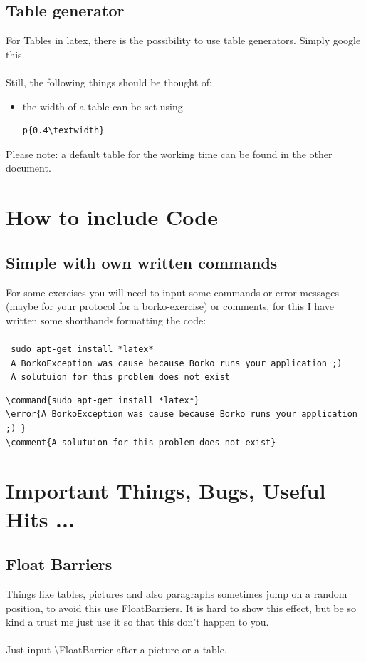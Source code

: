 \documentclass[12pt]{article}
\newcommand{\command}[1]{{\texttt{\color{blue} #1\\}}}
\newcommand{\error}[1]{{\texttt{\color{red} #1\\}}}
\newcommand{\comment}[1]{{\texttt{\color{OliveGreen} #1\\}}}
\begin{document}
\subsection{Table generator}
For Tables in latex, there is the possibility to use table generators. Simply google this.
\\ \\
Still, the following things should be thought of:
\\
\begin{itemize}
\item the width of a table can be set using 
\begin{lstlisting}
p{0.4\textwidth}
\end{lstlisting}
\end{itemize}

Please note: a default table for the working time can be found in the other document.


\newpage
\section{How to include Code}
\subsection{Simple with own written commands}
For some exercises you will need to input some commands or error messages (maybe for your protocol for a borko-exercise) or comments, for this I have written some shorthands formatting the code:\\\\
\command{sudo apt-get install *latex*}
\error{A BorkoException was cause because Borko runs your application ;) }
\comment{A solutuion for this problem does not exist}
\begin{lstlisting}
\command{sudo apt-get install *latex*}
\error{A BorkoException was cause because Borko runs your application ;) }
\comment{A solutuion for this problem does not exist}
\end{lstlisting}

\newpage
\section{Important Things, Bugs, Useful Hits ...}
\subsection{Float Barriers}
Things like tables, pictures and also paragraphs sometimes jump on a random position, to avoid this use FloatBarriers. It is hard to show this effect, but be so kind a trust me just use it so that this don't happen to you.\\\\
Just input \textbackslash{}FloatBarrier after a picture or a table.
\end{document}
